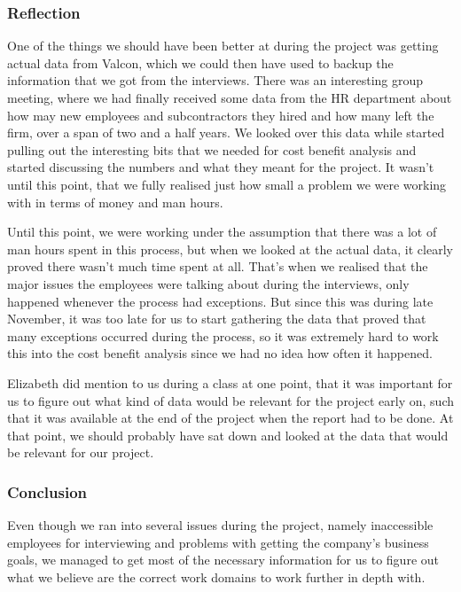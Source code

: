 \subsubsection{Reflection}
One of the things we should have been better at during the project was getting actual data from Valcon, which we could then have used to backup the information that we got from the interviews. There was an interesting group meeting, where we had finally received some data from the HR department about how may new employees and subcontractors they hired and how many left the firm, over a span of two and a half years. We looked over this data while started pulling out the interesting bits that we needed for cost benefit analysis and started discussing the numbers and what they meant for the project. It wasn't until this point, that we fully realised just how small a problem we were working with in terms of money and man hours. 

Until this point, we were working under the assumption that there was a lot of man hours spent in this process, but when we looked at the actual data, it clearly proved there wasn't much time spent at all. That's when we realised that the major issues the employees were talking about during the interviews, only happened whenever the process had exceptions. But since this was during late November, it was too late for us to start gathering the data that proved that many exceptions occurred during the process, so it was extremely hard to work this into the cost benefit analysis since we had no idea how often it happened.

Elizabeth did mention to us during a class at one point, that it was important for us to figure out what kind of data would be relevant for the project early on, such that it was available at the end of the project when the report had to be done. At that point, we should probably have sat down and looked at the data that would be relevant for our project.

\subsubsection{Conclusion}
Even though we ran into several issues during the project, namely inaccessible employees for interviewing and problems with getting the company’s business goals, we managed to get most of the necessary information for us to figure out what we believe are the correct work domains to work further in depth with.